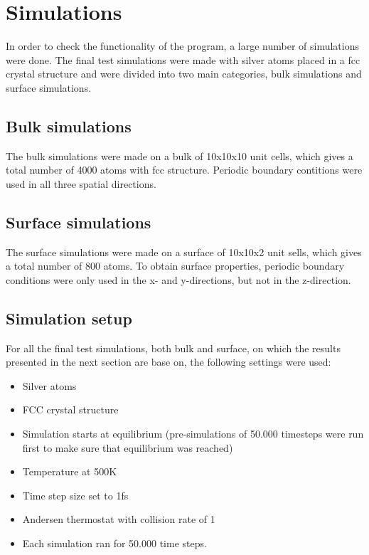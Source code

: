 \section{Simulations} 
In order to check the functionality of the program, a large number of simulations were done. The final test simulations were made with silver atoms placed in a fcc crystal structure and were divided into two main categories, bulk simulations and surface simulations.

\subsection{Bulk simulations}
The bulk simulations were made on a bulk of 10x10x10 unit cells, which gives a total number of 4000 atoms with fcc structure. Periodic boundary contitions were used in all three spatial directions. 

\subsection{Surface simulations}
The surface simulations were made on a surface of 10x10x2 unit sells, which gives a total number of 800 atoms. To obtain surface properties, periodic boundary conditions were only used in the x- and y-directions, but not in the z-direction.

\subsection{Simulation setup}
For all the final test simulations, both bulk and surface, on which the results presented in the next section are base on, the following settings were used:
\begin{itemize}
	\item Silver atoms
	\item FCC crystal structure
	\item Simulation starts at equilibrium (pre-simulations of 50.000 timesteps were run first to make sure that equilibrium was reached)
	\item Temperature at 500K
	\item Time step size set to 1fs
	\item Andersen thermostat with collision rate of 1%
	\item Each simulation ran for 50.000 time steps.
\end{itemize}